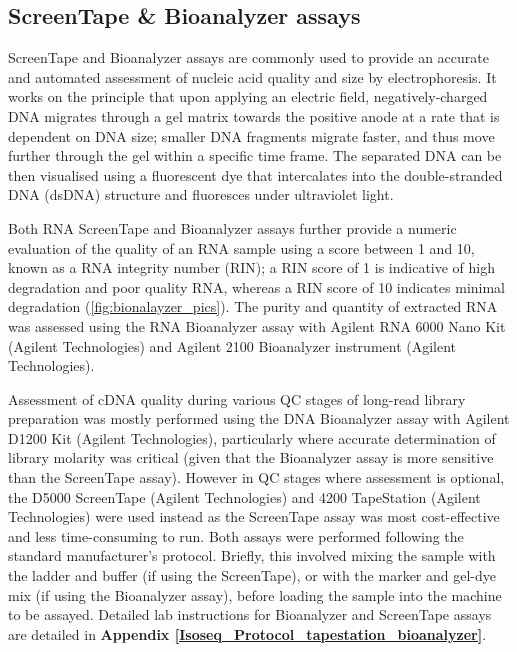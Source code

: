 \subsection{ScreenTape \& Bioanalyzer assays}
\label{section:ch2_bioanalyzer} 
ScreenTape and Bioanalyzer assays are commonly used to provide an accurate and automated assessment of nucleic acid quality and size by electrophoresis. It works on the principle that upon applying an electric field, negatively-charged DNA migrates through a gel matrix towards the positive anode at a rate that is dependent on DNA size; smaller DNA fragments migrate faster, and thus move further through the gel within a specific time frame. The separated DNA can be then visualised using a fluorescent dye that intercalates into the double-stranded DNA (dsDNA) structure and fluoresces under ultraviolet light. 

Both RNA ScreenTape and Bioanalyzer assays further provide a numeric evaluation of the quality of an RNA sample using a score between 1 and 10, known as a RNA integrity number (RIN); a RIN score of 1 is indicative of high degradation and poor quality RNA, whereas a RIN score of 10 indicates minimal degradation (\cref{fig:bionalayzer_pics}). The purity and quantity of extracted RNA was assessed using the RNA Bioanalyzer assay with Agilent RNA 6000 Nano Kit (Agilent Technologies) and Agilent 2100 Bioanalyzer instrument (Agilent Technologies). 

Assessment of cDNA quality during various QC stages of long-read library preparation was mostly performed using the DNA Bioanalyzer assay with Agilent D1200 Kit (Agilent Technologies), particularly where accurate determination of library molarity was critical (given that the Bioanalyzer assay is more sensitive than the ScreenTape assay). However in QC stages where assessment is optional, the D5000 ScreenTape (Agilent Technologies) and 4200 TapeStation (Agilent Technologies) were used instead as the ScreenTape assay was most cost-effective and less time-consuming to run. Both assays were performed following the standard manufacturer's protocol. Briefly, this involved mixing the sample with the ladder and buffer (if using the ScreenTape), or with the marker and gel-dye mix (if using the Bioanalyzer assay), before loading the sample into the machine to be assayed. Detailed lab instructions for Bioanalyzer and ScreenTape assays are detailed in \textbf{Appendix \ref{Isoseq_Protocol_tapestation_bioanalyzer}}.

